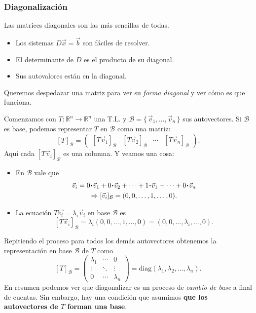 \documentclass[12pt]{article}
\theoremstyle{plain}
\theoremstyle{definition}
\theoremstyle{remark}
\newcommand{\la}{\lambda}           %
\newcommand{\bR}{\mathbb{R}}        %
\newcommand{\cB}{\mathcal{B}}       %
\renewcommand{\:}{\colon}           %
\renewcommand{\.}{\Cdot}                %
\newcommand{\threebythree}[9]{\begin{pmatrix} %
  #1 & #2 & #3 \\ #4 & #5 & #6 \\ #7 & #8 & #9 \end{pmatrix}}
\newcommand{\To}{\Rightarrow}
\newcommand{\set}[1]{\{\,#1\,\}}    %
\begin{document}
\begin{multicols}{2}

\subsubsection*{Diagonalización}

Las matrices diagonales son las más sencillas de todas.

\begin{itemize}
  \itemsep=-0.5em
  \item Los sistemas $D\vec{x}=\vec{b}$ son fáciles de resolver.
  \item El determinante de $D$ es el producto de su diagonal.
  \item Sus autovalores están en la diagonal.
\end{itemize}

Queremos despedazar una matriz para ver su \emph{forma diagonal} y ver cómo es que funciona.\par 
Comenzamos con $T:\bR^n\to\bR^n$ una T.L. y $\cB=\set{\vec v_1,\dots,\vec v_n}$ sus autovectores. Si $\cB$ es base, podemos representar $T$ en $\cB$ como una matriz:
$$[T]_\cB=\begin{pmatrix}
  [T\vec v_1]_\cB&[T\vec v_2]_\cB&\cdots&[T\vec v_n]_\cB
\end{pmatrix}.$$
Aquí cada $[T\vec v_i]_\cB$ es una columna. Y veamos una cosa:
\begin{itemize}
  \itemsep=-0.5em
  \item En $\cB$ vale que 
  \begin{gather*}
    \vec{v}_i=0\.\vec{v}_1+0\.\vec{v}_2+\dots+1\.\vec{v}_1+\dots+0\.\vec{v}_n\\
    \To[\vec{v}_i]_\cB=(0,0,\dots,1,\dots,0).
  \end{gather*}
  \item La ecuación $T\vec{v_i}=\la_i\vec{v}_i$ en base $\cB$ es 
  $$[T\vec{v}_i]_\cB=\la_i(0,0,\dots,1,\dots,0)=(0,0,\dots,\la_i,\dots,0).$$
\end{itemize}

Repitiendo el proceso para todos los demás autovectores obtenemos la representación en base $\cB$ de $T$ como
$$[T]_\cB=\threebythree{\la_1}{\cdots}{0}{\vdots}{\ddots}{\vdots}{0}{\cdots}{\la_n}=\text{diag}(\la_1,\la_2,\dots,\la_n).$$
En resumen podemos ver que diagonalizar es un proceso de \emph{cambio de base} a final de cuentas. Sin embargo, hay una condición que asumimos \textbf{que los autovectores de $T$ forman una base}.


\end{multicols}
\end{document}
